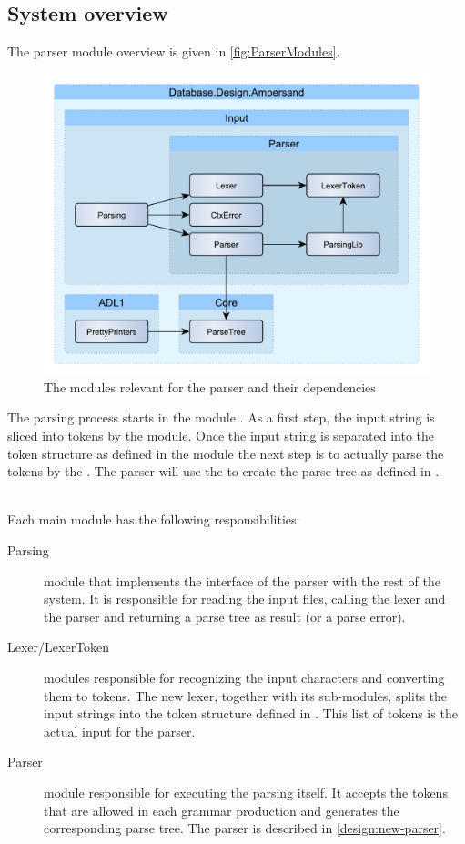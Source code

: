 
\subsection{System overview}
\label{design:system-overview}
  The parser module overview is given in \autoref{fig:ParserModules}.
  \begin{figure}[ht]%
    \centering
    \includegraphics[width=0.7\columnwidth]{Figures/ParserModules}
    \caption{The modules relevant for the parser and their dependencies}
    \label{fig:ParserModules}
  \end{figure}%

  \noindent
  The parsing process starts in the module .
  As a first step, the input string is sliced into tokens by the  module.
  Once the input string is separated into the token structure as defined in the module  the next step is to actually parse the tokens by the .
  The parser will use the  to create the parse tree as defined in .

  ~\\\noindent
  Each main module has the following responsibilities:
  \begin{description}
    \item[Parsing] module that implements the interface of the parser with the rest of the system.
      It is responsible for reading the input files, calling the lexer and the parser and returning a parse tree as result (or a parse error).

    \item[Lexer/LexerToken] modules responsible for recognizing the input characters and converting them to tokens.
      The new lexer, together with its sub-modules, splits the input strings into the token structure defined in .
      This list of tokens is the actual input for the parser.

    \item[Parser] module responsible for executing the parsing itself.
      It accepts the tokens that are allowed in each grammar production and generates the corresponding parse tree.
      The parser is described in \autoref{design:new-parser}.
 \end{description}

